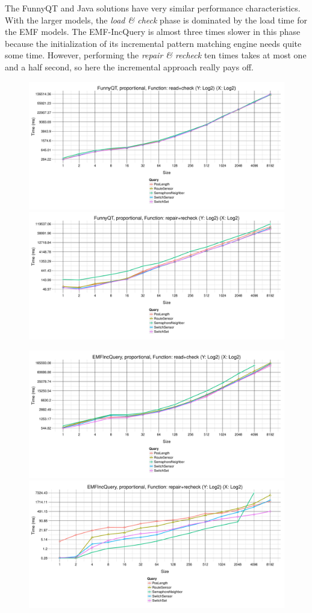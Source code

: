 \documentclass[submission]{eptcs}
\begin{document}
The FunnyQT and Java solutions have very similar performance characteristics.
With the larger models, the \emph{load \& check} phase is dominated by the load
time for the EMF models.  The EMF-IncQuery is almost three times slower in this
phase because the initialization of its incremental pattern matching engine
needs quite some time.  However, performing the \emph{repair \& recheck} ten
times takes at most one and a half second, so here the incremental approach
really pays off.

\begin{figure}[h!tb]
  \centering
  \includegraphics[width=.495\textwidth]{perf/proportional-FunnyQT-GroupBy-Query-time-batch-validation}
  \includegraphics[width=.495\textwidth]{perf/proportional-FunnyQT-GroupBy-Query-time-revalidation}

  \includegraphics[width=.495\textwidth]{perf/proportional-EMFIncQuery-GroupBy-Query-time-batch-validation}
  \includegraphics[width=.495\textwidth]{perf/proportional-EMFIncQuery-GroupBy-Query-time-revalidation}


\end{figure}
\end{document}
